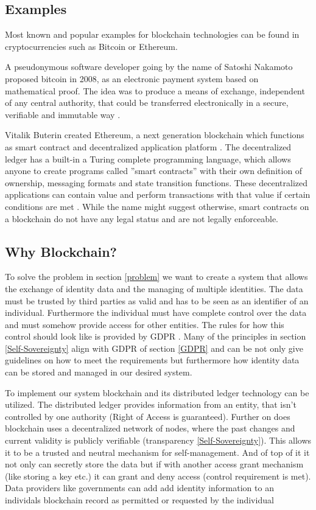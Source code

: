\subsection{Examples}

Most known and popular examples for blockchain technologies can be found in cryptocurrencies such as Bitcoin or Ethereum.

A pseudonymous software developer going by the name of Satoshi Nakamoto proposed bitcoin in 2008, as an electronic payment system based on mathematical proof. The idea was to produce a means of exchange, independent of any central authority, that could be transferred electronically in a secure, verifiable and immutable way \cite{bitcoin} .

Vitalik Buterin created Ethereum, a next generation blockchain which functions as smart contract and decentralized application platform \cite{ethereum} .
The decentralized ledger has a built-in a Turing complete programming language, which allows anyone to create programs called ”smart contracts” with their own definition of ownership, messaging formats and state transition functions.
These decentralized applications can contain value and perform transactions with that value if certain conditions are met \cite{overall} . While the name might suggest otherwise, smart contracts on a blockchain do not have any legal status and are not legally enforceable.

\subsection{Why Blockchain?}

To solve the problem in section \ref{problem} we want to create a system that allows the exchange of identity data and the managing of multiple identities. The data must be trusted by third parties as valid and has to be seen as an identifier of an individual. Furthermore the individual must have complete control over the data and must somehow provide access for other entities. The rules for how this control should look like is provided by GDPR .
Many of the principles in section \ref{Self-Sovereignty} align with GDPR of section \ref{GDPR} and can be not only give guidelines on how to meet the requirements but furthermore how identity data can be stored and managed in our desired system. 

To implement our system blockchain and its distributed ledger technology can be utilized. The distributed ledger provides information from an entity, that isn't controlled by one authority (Right of Access is guaranteed). Further on does blockchain uses a decentralized network of nodes, where the past changes and current validity is publicly verifiable (transparency \ref{Self-Sovereignty}). This allows it to be a trusted and neutral mechanism for self-management.
And of top of it it not only can secretly store the data but if with another access grant mechanism (like storing a key etc.) it can grant and deny access (control requirement is met). Data providers like governments can add add identity information to an individals blockchain record as permitted or requested by the individual

